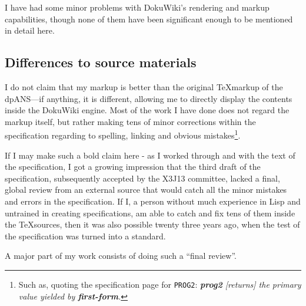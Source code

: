 I have had some minor problems with DokuWiki's rendering and markup capabilities, though none of them have been significant enough to be mentioned in detail here.

\subsection{Differences to source materials}

I do not claim that my markup is better than the original \TeX markup of the dpANS---if anything, it is different, allowing me to directly display the contents inside the DokuWiki engine. Most of the work I have done does not regard the markup itself, but rather making tens of minor corrections within the specification regarding to spelling, linking and obvious mistakes\footnote{Such as, quoting the specification page for \texttt{PROG2}: \textit{\textbf{prog2} [returns] the primary value yielded by \textbf{first-form}.}}.

If I may make such a bold claim here - as I worked through and with the text of the specification, I got a growing impression that the third draft of the specification, subsequently accepted by the X3J13 committee, lacked a final, global review from an external source that would catch all the minor mistakes and errors in the specification. If I, a person without much experience in Lisp and untrained in creating specifications, am able to catch and fix tens of them inside the \TeX sources, then it was also possible twenty three years ago, when the test of the specification was turned into a standard.

A major part of my work consists of doing such a ``final review''.
